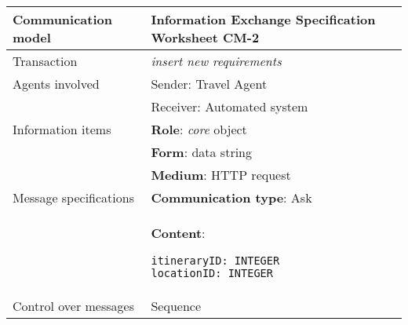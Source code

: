 \newline
\vspace{0.8 cm}
\newline
\noindent
\begin{tabular}%
      {|p{4cm}%
        |p{8cm}|}
\hline
{\bf Communication model} &
   {\bf Information Exchange Specification Worksheet CM-2} \\
\hline
\hline
\sc Transaction &
   {\em
   insert new requirements
   } \\
\hline
\sc Agents involved &
   {\rm Sender: Travel Agent} \\
   & {\rm Receiver: Automated system}\\
\hline
\sc Information items 
&  {\bf Role}: {\em core} object
   \\
&  {\bf Form}: data string
   \\
&  {\bf Medium}: HTTP request
   \\
\hline
\sc Message specifications 
&  {\bf Communication type}: Ask
   \\
&  {\bf Content}: 
\begin{lstlisting}[breaklines=true,mathescape=true]
itineraryID: INTEGER
locationID: INTEGER
\end{lstlisting}
   \\
\hline
\sc Control over messages &
   Sequence
   \\
\hline
\end{tabular}
